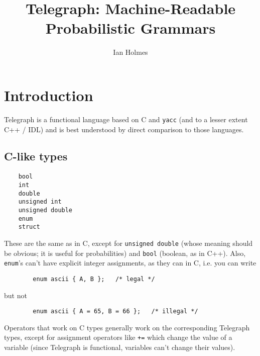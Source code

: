\documentclass{article}
\begin{document}
\newcommand\Telegraph{{\tt telegraph}}

\title{Telegraph: Machine-Readable Probabilistic Grammars}
\author{Ian Holmes}
\maketitle


\section{Introduction}

Telegraph is a functional language based on C and {\tt yacc} (and to a lesser
extent C++ / IDL) and is best understood by direct comparison to those
languages.

\subsection{C-like types}

\begin{verbatim}
	bool
	int
	double
	unsigned int
	unsigned double
	enum
	struct
\end{verbatim}

These are the same as in C, except for {\tt unsigned double} (whose meaning
should be obvious; it is useful for probabilities) and {\tt bool} (boolean,
as in C++). Also, {\tt enum}'s can't have explicit integer assignments, as they
can in C, i.e. you can write

\begin{verbatim}
		enum ascii { A, B };   /* legal */
\end{verbatim}

but not

\begin{verbatim}
		enum ascii { A = 65, B = 66 };   /* illegal */
\end{verbatim}

Operators that work on C types generally work on the corresponding
Telegraph types, except for assignment operators like {\tt +=}
which change the value of a variable (since Telegraph is functional,
variables can't change their values).
\end{document}
